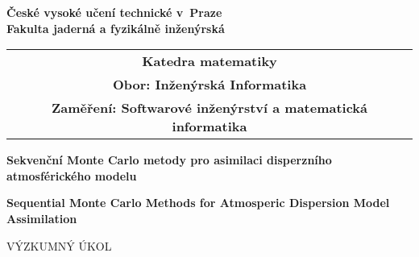 \newcommand{\cvut}{České vysoké učení technické v~Praze}
\newcommand{\fjfi}{Fakulta jaderná a fyzikálně inženýrská}
\newcommand{\km}{Katedra matematiky}
\newcommand{\obor}{Inženýrská Informatika}
\newcommand{\zamereni}{Softwarové inženýrství a matematická informatika}

\newcommand{\nazevcz}{Sekvenční Monte Carlo metody pro asimilaci disperzního atmosférického modelu}
\newcommand{\nazeven}{Sequential Monte Carlo Methods for Atmosperic Dispersion Model Assimilation}
\newcommand{\autor}{Matěj Laitl}
\newcommand{\rok}{2012}
\newcommand{\vedouci}{Ing. Václav Šmídl, Ph.D.}

\newcommand{\pracovisteVed}{Oddělení adaptivních systémů \\
	Ústav teorie informace a automatizace \\
	Akademie věd České republiky}
\newcommand{\konzultant}{Ing. Radek Hofman, Ph.D.}
\newcommand{\pracovisteKonz}{Oddělení adaptivních systémů \\
	Ústav teorie informace a automatizace \\
	Akademie věd České republiky}

\newcommand{\klicova}{TODO, TODO}
\newcommand{\keyword}{TODO, TODO}
\newcommand{\abstrCZ}{TODO.}
\newcommand{\abstrEN}{TODO.}


\thispagestyle{empty}

\begin{center}
	{\Large  \bf  \cvut\\[2mm] \fjfi }
	\vspace{10mm}

	\begin{tabular}{c}
	{\bf \km}\\
	{\bf Obor: \obor}\\
	{\bf Zaměření: \zamereni}
	\end{tabular}

	\vspace{10mm} \epsfysize=20mm   \vspace{15mm}

	{\LARGE
	\textbf{\nazevcz}
	\par}

	\vspace{5mm}

	{\LARGE
	\textbf{\nazeven}
	\par}

	\vspace{30mm}
	{\Large VÝZKUMNÝ ÚKOL}

\end{center}


